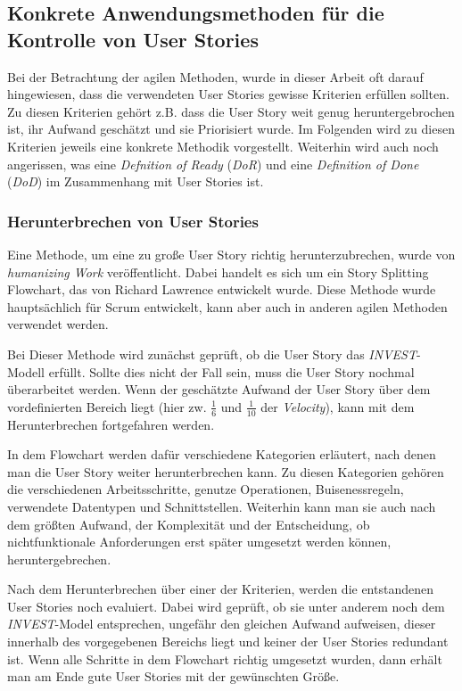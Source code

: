 \documentclass[acmtog]{acmart}
\begin{document}
\subsection{Konkrete Anwendungsmethoden für die Kontrolle von User Stories}

Bei der Betrachtung der agilen Methoden, wurde in dieser Arbeit oft darauf hingewiesen, dass die verwendeten User Stories gewisse Kriterien 
erfüllen sollten. Zu diesen Kriterien gehört z.B. dass die User Story weit genug heruntergebrochen ist, ihr Aufwand geschätzt und sie Priorisiert 
wurde. Im Folgenden wird zu diesen Kriterien jeweils eine konkrete Methodik vorgestellt. Weiterhin wird auch noch angerissen, was eine \emph{Defnition of 
Ready}  (\emph{DoR}) und eine \emph{Definition of Done} (\emph{DoD}) im Zusammenhang mit User Stories ist.

\subsubsection{Herunterbrechen von User Stories} \label{sec:breakedown}

Eine Methode, um eine zu große User Story richtig herunterzubrechen, wurde von \emph{humanizing Work} veröffentlicht. Dabei handelt es sich um ein Story 
Splitting Flowchart, das von Richard Lawrence entwickelt wurde. Diese Methode wurde hauptsächlich für Scrum entwickelt, kann aber auch 
in anderen agilen Methoden verwendet werden. \cite{humanizingwork}

Bei Dieser Methode wird zunächst geprüft, ob die User Story das \emph{INVEST}-Modell erfüllt. Sollte dies nicht der Fall sein, muss die User Story nochmal 
überarbeitet werden. Wenn der geschätzte Aufwand der User Story über dem vordefinierten Bereich liegt (hier zw. \( \frac{1}{6} \) und \( \frac{1}{10} \) der \emph{Velocity}), kann mit dem Herunterbrechen 
fortgefahren werden. \cite{humanizingwork}

In dem Flowchart werden dafür verschiedene Kategorien erläutert, nach denen man die User Story weiter herunterbrechen kann. Zu diesen Kategorien 
gehören die verschiedenen Arbeitsschritte, genutze Operationen, Buisenessregeln, verwendete Datentypen und Schnittstellen. Weiterhin kann man sie auch nach dem größten 
Aufwand, der Komplexität und der Entscheidung, ob nichtfunktionale Anforderungen erst später umgesetzt werden können, heruntergebrechen. \cite{humanizingwork}

Nach dem Herunterbrechen über einer der Kriterien, werden die entstandenen User Stories noch evaluiert. Dabei wird geprüft, ob sie
unter anderem noch dem \emph{INVEST}-Model entsprechen, ungefähr den gleichen Aufwand aufweisen, dieser innerhalb des vorgegebenen Bereichs liegt und 
keiner der User Stories redundant ist. Wenn alle Schritte in dem Flowchart richtig umgesetzt wurden, dann erhält man am Ende gute User Stories mit der 
gewünschten Größe. \cite{humanizingwork}
\end{document}
